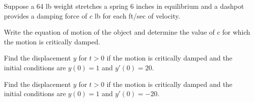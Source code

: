 \setcounter{example}{0}
\begin{example}
  \label{example:6.2.1}\rm Suppose a 64 lb weight stretches a spring 6 inches in equilibrium and a
  dashpot provides a damping force of $c$ lb for each ft/sec of velocity.
  \begin{alist}
    \item %
    Write the equation of motion of the object and determine the value of $c$ for which the motion
    is critically damped.

    \item %
    Find the displacement $y$ for $t>0$ if the motion is critically damped and the initial
    conditions are $y(0)=1$ and $y'(0)=20$.

    \item %
    Find the displacement $y$ for $t>0$ if the motion is critically damped and the initial
    conditions are $y(0)=1$ and $y'(0)=-20$.
  \end{alist}
\end{example}
\setcounter{equation}{3}
\setcounter{figure}{1}
